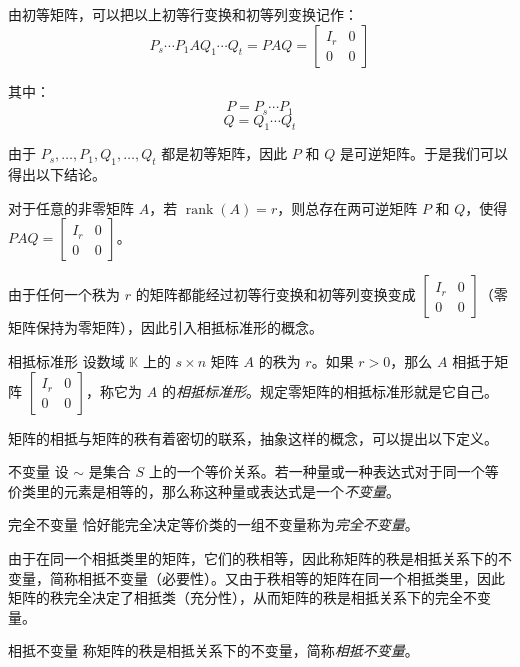 由初等矩阵，可以把以上初等行变换和初等列变换记作：
$$
P_s \cdots P_1 A Q_1 \cdots Q_t = PAQ = \begin{bmatrix} I_r & 0 \\ 0 & 0 \end{bmatrix}
$$

其中：
$$
P = P_s \cdots P_1
$$$$
Q = Q_1 \cdots Q_t
$$

由于 $P_s, \ldots, P_1, Q_1, \ldots, Q_t$ 都是初等矩阵，因此 $P$ 和 $Q$ 是可逆矩阵。于是我们可以得出以下结论。

\begin{theorem}
	对于任意的非零矩阵 $A$，若 $\operatorname{rank}(A) = r$，则总存在两可逆矩阵 $P$ 和 $Q$，使得 $PAQ = \begin{bmatrix} I_r & 0 \\ 0 & 0 \end{bmatrix}$。
\end{theorem}

由于任何一个秩为 $r$ 的矩阵都能经过初等行变换和初等列变换变成 $\begin{bmatrix} I_r & 0 \\ 0 & 0 \end{bmatrix}$（零矩阵保持为零矩阵），因此引入相抵标准形的概念。

\begin{definition}{相抵标准形}
	设数域 $\mathbb K$ 上的 $s \times n$ 矩阵 $A$ 的秩为 $r$。如果 $r > 0$，那么 $A$ 相抵于矩阵 $\begin{bmatrix} I_r & 0 \\ 0 & 0 \end{bmatrix}$，称它为 $A$ 的\emph{相抵标准形}。规定零矩阵的相抵标准形就是它自己。
\end{definition}

矩阵的相抵与矩阵的秩有着密切的联系，抽象这样的概念，可以提出以下定义。

\begin{definition}{不变量}
	设 $\sim$ 是集合 $S$ 上的一个等价关系。若一种量或一种表达式对于同一个等价类里的元素是相等的，那么称这种量或表达式是一个\emph{不变量}。
\end{definition}

\begin{definition}{完全不变量}
	恰好能完全决定等价类的一组不变量称为\emph{完全不变量}。
\end{definition}

由于在同一个相抵类里的矩阵，它们的秩相等，因此称矩阵的秩是相抵关系下的不变量，简称相抵不变量（必要性）。又由于秩相等的矩阵在同一个相抵类里，因此矩阵的秩完全决定了相抵类（充分性），从而矩阵的秩是相抵关系下的完全不变量。

\begin{definition}{相抵不变量}
	称矩阵的秩是相抵关系下的不变量，简称\emph{相抵不变量}。
\end{definition}

